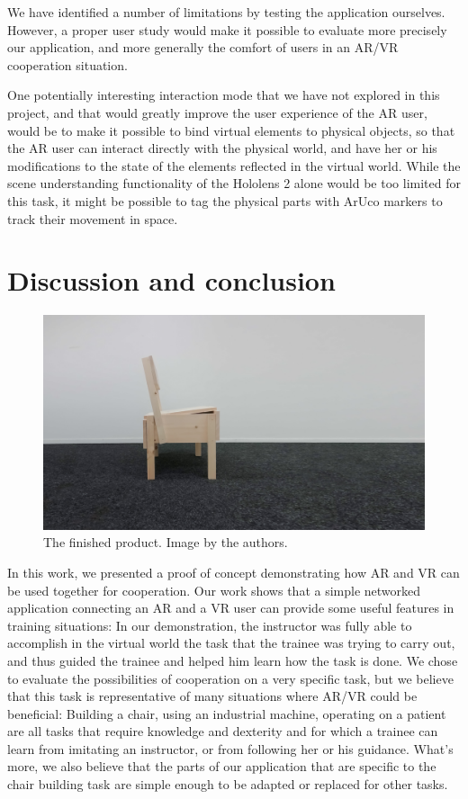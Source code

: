 \documentclass[10pt,twocolumn,letterpaper,english]{article}
\begin{document}
We have identified a number of limitations by testing the application ourselves. However, a proper user study would make it possible to evaluate more precisely our application, and more generally the comfort of users in an AR/VR cooperation situation.

One potentially interesting interaction mode that we have not explored in this project, and that would greatly improve the user experience of the AR user, would be to make it possible to bind virtual elements to physical objects, so that the AR user can interact directly with the physical world, and have her or his modifications to the state of the elements reflected in the virtual world. While the scene understanding functionality of the Hololens 2 alone would be too limited for this task, it might be possible to tag the physical parts with ArUco markers to track their movement in space.


\section{Discussion and conclusion}

\begin{figure}[htp]
    \centering
    \includegraphics[width=1\linewidth]{Chair.jpg}
    \caption{The finished product. Image by the authors.}
    \label{fig:Chair}
\end{figure}

In this work, we presented a proof of concept demonstrating how AR and VR can be used together for cooperation. Our work shows that a simple networked application connecting an AR and a VR user can provide some useful features in training situations: In our demonstration, the instructor was fully able to accomplish in the virtual world the task that the trainee was trying to carry out, and thus guided the trainee and helped him learn how the task is done. We chose to evaluate the possibilities of cooperation on a very specific task, but we believe that this task is representative of many situations where AR/VR could be beneficial: Building a chair, using an industrial machine, operating on a patient are all tasks that require knowledge and dexterity and for which a trainee can learn from imitating an instructor, or from following her or his guidance. What's more, we also believe that the parts of our application that are specific to the chair building task are simple enough to be adapted or replaced for other tasks.
\end{document}
